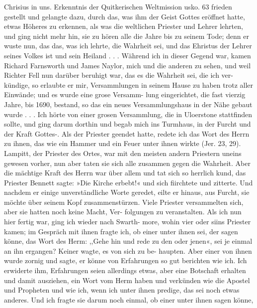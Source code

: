 Chrisius in uns. Erkenntnis der Quitkerischen Weltmission usko. 63
frieden gestellt und gelangte dazu, durch das, was ihm der Geist
Gottes eröffnet hatte, etwas Höheres zu erkennen, als was die
weltlichen Priester und Lehrer lehrten, und ging nicht mehr hin,
sie zu hören alle die Jahre bis zu seinem Tode; denn er wuste
nun, das das, was ich lehrte, die Wahrheit sei, und das Ehristus
der Lehrer seines Volkes ist und sein Heiland . . . Während ich
in dieser Gegend war, kamen Richard Farnsworth und James
Naylor, mich und die anderen zu sehen, und weil Richter Fell
nun darüber beruhigt war, das es die Wahrheit sei, die ich ver-
kündige, so erlaubte er mir, Versammlungen in seinem Hause zu
haben trotz aller Einwände; und es wurde eine grose Versamm-
lung eingerichtet, die fast vierzig Jahre, bis 1690, bestand, so
das ein neues Versammlungshaus in der Nähe gebaut wurde . . .
Ich hörte von einer grosen Versammlung, die in Uloerstone
stattfinden sollte, und ging darum dorthin und begab mich ins
Turmhaus, in der Furcht und der Kraft Gottes-. Als der Priester
geendet hatte, redete ich das Wort des Herrn zu ihnen, das wie ein
Hammer und ein Feuer unter ihnen wirkte (Jer. 23, 29). Lampitt,
der Priester des Ortes, war mit den meisten andern Priestern
uneins gewesen vorher, nun aber taten sie sich alle zusammen
gegen die Wahrheit. Aber die mächtige Kraft des Herrn war
über allem und tat sich so herrlich kund, das Priester Bennett
sagte: »Die Kirche erbebt!« und sich fiirchtete und zitterte. Und
nachdem er einige unverständliche Worte geredet, eilte er hinaus,
aus Furcht, sie möchte über seinem Kopf zusammenstürzen. Viele
Priester versammelten sich, aber sie hatten noch keine Macht, Ver-
folgungen zu veranstalten.
Als ich nun hier fertig war, ging ich wieder nach Swarth-
more, wohin vier oder siins Priester kamen; im Gespräch mit
ihnen fragte ich, ob einer unter ihnen sei, der sagen könne, das
Wort des Herm: ,,Gehe hin und rede zu den oder jenen«, sei je
einmal an ihn ergangen? Keiner wagte, es von sich zu be-
haupten. Aber einer von ihnen wurde zornig und sagte, er
könne von Erfahrungen so gut berichten wie ich. Ich erwiderte
ihm, Erfahrungen seien allerdings etwas, aber eine Botschaft
erhalten und damit ausziehen, ein Wort vom Herm haben und
verkünden wie die Apostel und Propheten und wie ich, wenn
ich unter ihnen predige, das sei noch etwas anderes. Und ich
fragte sie darum noch einmal, ob einer unter ihnen sagen könne,


